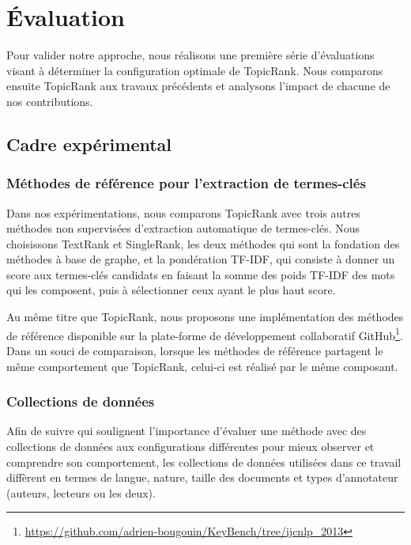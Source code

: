 \section{Évaluation}
\label{sec:evaluation}
  Pour valider notre approche, nous réalisons une première série d'évaluations
  visant à déterminer la configuration optimale de TopicRank. Nous comparons 
  ensuite Topic\-Rank aux travaux précédents et analysons l'impact de chacune de
  nos contributions.

  \subsection{Cadre expérimental}
  \label{subsec:cadre_experimental}
    \subsubsection{Méthodes de référence pour l'extraction de termes-clés}
    \label{subsubsec:systemes_de_reference_pour_l_extraction_de_termes_cles}
      Dans nos expérimentations, nous comparons TopicRank avec trois autres
      méthodes non supervisées d'extraction automatique de termes-clés. Nous
      choisissons TextRank et SingleRank, les deux méthodes qui sont la
      fondation des méthodes à base de graphe, et la pondération TF-IDF, qui
      consiste à donner un score aux termes-clés candidats en faisant la somme
      des poids TF-IDF des mots qui les composent, puis à sélectionner ceux
      ayant le plus haut score.

      Au même titre que TopicRank, nous proposons une implémentation des
      méthodes de référence disponible sur la plate-forme de développement
      collaboratif
      GitHub\footnote{\url{https://github.com/adrien-bougouin/KeyBench/tree/ijcnlp_2013}}.
      Dans un souci de comparaison, lorsque les méthodes de référence partagent
      le même comportement que TopicRank, celui-ci est réalisé par le même
      composant.

    \subsubsection{Collections de données}
    \label{subsubsec:donnees_de_test}
      Afin de suivre  qui soulignent l'importance
      d'évaluer une méthode avec des collections de données aux configurations
      différentes pour mieux observer et comprendre son comportement, les
      collections de données utilisées dans ce travail diffèrent en termes de
      langue, nature, taille des documents et types d'annotateur (auteurs,
      lecteurs ou les deux).

